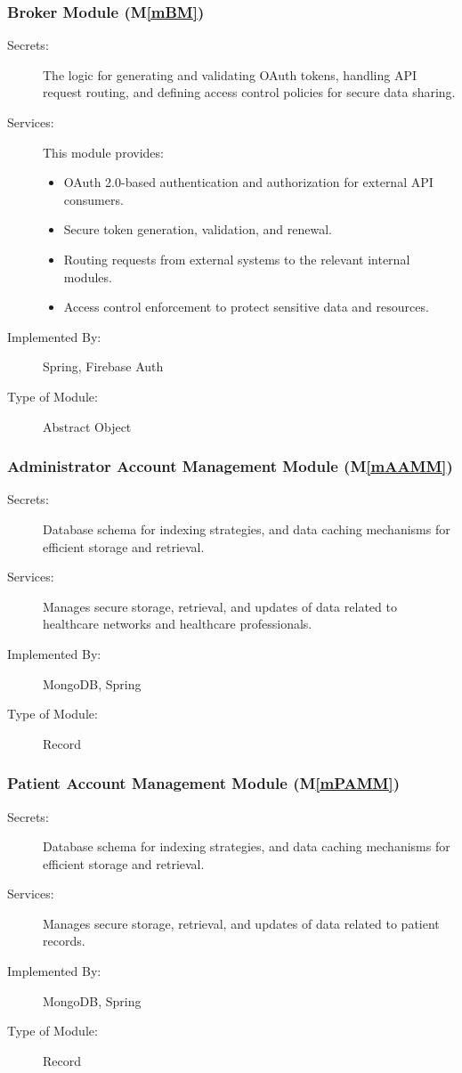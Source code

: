 \documentclass[12pt, titlepage]{article}
\newcommand{\mref}[1]{M\ref{#1}}
\begin{document}
\subsubsection{Broker Module (\mref{mBM})}

\begin{description}
\item[Secrets:]The logic for generating and validating OAuth tokens, handling API request routing, and defining access control policies for secure data sharing.
\item[Services:]This module provides:
\begin{itemize}
    \item OAuth 2.0-based authentication and authorization for external API consumers.
    \item Secure token generation, validation, and renewal.
    \item Routing requests from external systems to the relevant internal modules.
    \item Access control enforcement to protect sensitive data and resources.
\end{itemize}
\item[Implemented By:]Spring, Firebase Auth
\item[Type of Module:]Abstract Object
\end{description}

\subsubsection{Administrator Account Management Module (\mref{mAAMM})}

\begin{description}
\item[Secrets:]Database schema for indexing strategies, and data caching mechanisms for efficient storage and retrieval.
\item[Services:]Manages secure storage, retrieval, and updates of data related to healthcare networks and healthcare professionals.
\item[Implemented By:]MongoDB, Spring
\item[Type of Module:]Record
\end{description}

\subsubsection{Patient Account Management Module (\mref{mPAMM})}

\begin{description}
\item[Secrets:]Database schema for indexing strategies, and data caching mechanisms for efficient storage and retrieval.
\item[Services:]Manages secure storage, retrieval, and updates of data related to patient records.
\item[Implemented By:]MongoDB, Spring
\item[Type of Module:]Record
\end{description}
\end{document}
